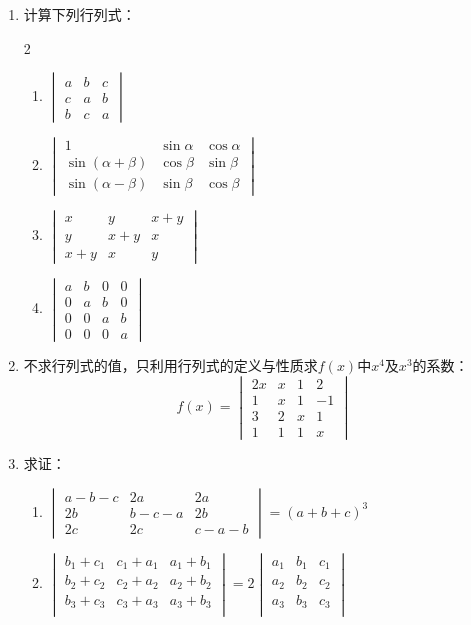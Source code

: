 \begin{enumerate}
\item 计算下列行列式：
\begin{multicols}{2}
\begin{enumerate}
    \item $\begin{vmatrix}
        a&b&c\\c&a&b\\b&c&a
    \end{vmatrix}$
    \item $\begin{vmatrix}
        1&\sin\alpha&\cos\alpha\\\sin(\alpha+\beta)&\cos\beta&\sin\beta\\
        \sin(\alpha-\beta)&\sin\beta&\cos\beta
    \end{vmatrix}$
    \item $\begin{vmatrix}
x&y&x+y\\y&x+y&x\\x+y&x&y        
    \end{vmatrix}$
    \item $\begin{vmatrix}
        a&b&0&0\\0&a&b&0\\0&0&a&b\\0&0&0&a
    \end{vmatrix}$
\end{enumerate}
\end{multicols}

\item 不求行列式的值，只利用行列式的定义与性质求$f(x)$中$x^4$及$x^3$的系数：
\[f(x)=\begin{vmatrix}
    2x&x&1&2\\1&x&1&-1\\3&2&x&1\\1&1&1&x
\end{vmatrix}\]

\item 求证：
\begin{enumerate}
    \item $\begin{vmatrix}
        a-b-c&2a&2a\\2b&b-c-a&2b\\2c&2c&c-a-b
    \end{vmatrix}=(a+b+c)^3$
    \item $\begin{vmatrix}
        b_1+c_1&c_1+a_1&a_1+b_1\\
        b_2+c_2&c_2+a_2&a_2+b_2\\
        b_3+c_3&c_3+a_3&a_3+b_3\\
    \end{vmatrix}=2\begin{vmatrix}
        a_1&b_1&c_1\\a_2&b_2&c_2\\a_3&b_3&c_3\\
    \end{vmatrix}$
\end{enumerate}


\end{enumerate}
